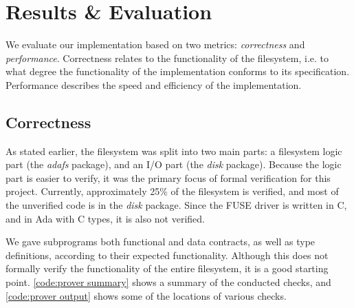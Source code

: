 \section{Results \& Evaluation}
We evaluate our implementation based on two metrics: \textit{correctness} and \textit{performance}.
Correctness relates to the functionality of the filesystem, i.e. to what degree the functionality of the implementation conforms to its specification.
Performance describes the speed and efficiency of the implementation.

\subsection{Correctness}
As stated earlier, the filesystem was split into two main parts: a filesystem logic part (the \textit{adafs} package), and an I/O part (the \textit{disk} package).
Because the logic part is easier to verify, it was the primary focus of formal verification for this project.
Currently, approximately 25\% of the filesystem is verified, and most of the unverified code is in the \textit{disk} package.
Since the FUSE driver is written in C, and in Ada with C types, it is also not verified.

We gave subprograms both functional and data contracts, as well as type definitions, according to their expected functionality.
Although this does not formally verify the functionality of the entire filesystem, it is a good starting point.
\autoref{code:prover summary} shows a summary of the conducted checks, and \autoref{code:prover output} shows some of the locations of various checks.

